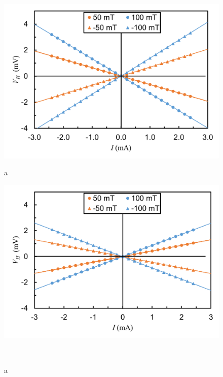 \documentclass[11pt,dvipdfmx,a4paper]{jsarticle}
\numberwithin{equation}{section}
\begin{document}
\begin{figure}[h]
	\centering
	\begin{minipage}{0.49\columnwidth}
		\centering
		\includegraphics[width=\columnwidth]{graph/graph04.png}
		\caption{a}
		\label{graph:04}
	\end{minipage}
	\hfil
	\begin{minipage}{0.49\columnwidth}
		\centering
		\includegraphics[width=\columnwidth]{graph/graph05.png}
		\caption{a}
		\label{graph:05}
	\end{minipage}\\


\end{figure}
\end{document}
